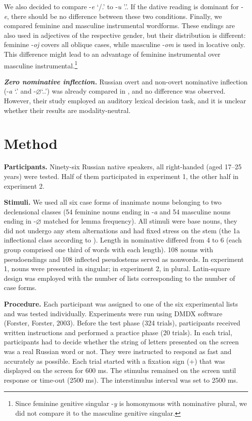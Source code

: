 \documentclass[output=paper, modfonts,newtxmath,hidelinks]{langscibook}
\begin{document}
We also decided to compare -\textit{e} `\datt/\locc.\fem' to -\textit{u} '\datt.\masc'. If the dative reading is dominant for -\textit{e}, there should be no difference between these two conditions. Finally, we compared feminine and masculine instrumental wordforms. These endings are also used in adjectives of the respective gender, but their distribution is different: feminine -\textit{oj} covers all oblique cases, while masculine -\textit{om} is used in locative only. This difference might lead to an advantage of feminine instrumental over masculine instrumental.\footnote{ Since feminine genitive singular -\textit{y} is homonymous with nominative plural, we did not compare it to the masculine genitive singular.}

\textbf{\textit{Zero nominative inflection.}} Russian overt and non-overt nominative inflection (-\textit{a} `\nomm.\fem' and -\textit{$\varnothing$}`\nomm.\accc.\masc') was already compared in \citet{gor2017processing}, and no difference was observed. However, their study employed an auditory lexical decision task, and it is unclear whether their results are modality-neutral.

\section{Method}

\textbf{Participants.}  
Ninety-six Russian native speakers, all right-handed (aged 17–25 years) were tested. Half of them participated in experiment 1, the other half in experiment 2.

\textbf{Stimuli.} 
We used all six case forms of inanimate nouns belonging to two declensional classes (54 feminine nouns ending in -\textit{a} and 54 masculine nouns ending in -\textit{$\varnothing$} matched for lemma frequency). All stimuli were base nouns, they did not undergo any stem alternations and had fixed stress on the stem (the 1a inflectional class according to \citealt{zaliznyak1977grammatical}). Length in nominative differed from 4 to 6 (each group comprised one third of words with each length). 108 nouns with pseudoendings and 108 inflected pseudostems served as nonwords. In experiment 1, nouns were presented in singular; in experiment 2, in plural. Latin-square design was employed with the number of lists corresponding to the number of case forms.

\textbf{Procedure.} 
Each participant was assigned to one of the six experimental lists and was tested individually. Experiments were run using DMDX software (Forster, Forster, 2003). Before the test phase (324 trials), participants received written instructions and performed a practice phase (20 trials). In each trial, participants had to decide whether the string of letters presented on the screen was a real Russian word or not. They were instructed to respond as fast and accurately as possible. Each trial started with a fixation sign (+) that was displayed on the screen for 600 ms. The stimulus remained on the screen until response or time-out (2500 ms). The interstimulus interval was set to 2500 ms.
\end{document}
